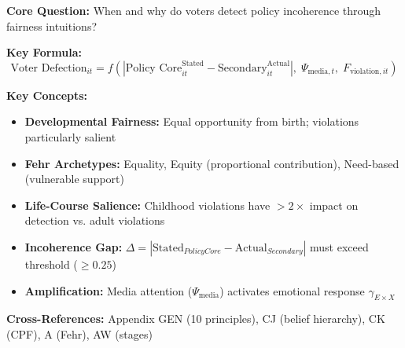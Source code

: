\begin{tcolorbox}[colback=blue!5!white, colframe=blue!75!black,
    title=Quick Reference: Developmental Fairness]

\textbf{Core Question:} When and why do voters detect policy incoherence through fairness intuitions?

\textbf{Key Formula:}
\begin{equation}
\text{Voter Defection}_{it} = f\left(|\text{Policy Core}^{\text{Stated}}_{it} - \text{Secondary}^{\text{Actual}}_{it}|, \; \Psi_{\text{media},t}, \; F_{\text{violation},it}\right)
\end{equation}

\textbf{Key Concepts:}
\begin{itemize}[nosep]
\item \textbf{Developmental Fairness:} Equal opportunity from birth; violations particularly salient
\item \textbf{Fehr Archetypes:} Equality, Equity (proportional contribution), Need-based (vulnerable support)
\item \textbf{Life-Course Salience:} Childhood violations have $>2\times$ impact on detection vs. adult violations
\item \textbf{Incoherence Gap:} $\Delta = |\text{Stated}_{Policy Core} - \text{Actual}_{Secondary}|$ must exceed threshold ($\geq 0.25$)
\item \textbf{Amplification:} Media attention ($\Psi_{\text{media}}$) activates emotional response $\gamma_{E \times X}$
\end{itemize}

\textbf{Cross-References:}
Appendix GEN (10 principles), CJ (belief hierarchy), CK (CPF), A (Fehr), AW (stages)

\end{tcolorbox}



